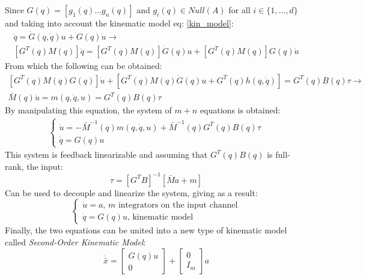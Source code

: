 \begin{itemize}
    Since $G(q)=[g_1(q)\dots g_n(q)]$ and $g_i(q)\in Null(A)$ for all $i \in \{1,\dots,d\}$ and taking into account the kinematic model eq: \ref{kin_model}:     
    \begin{gather*}
        \ddot{q}=\dot{G}(q,\dot{q})u+G(q)\dot{u}\rightarrow\\
        [G^{T}(q)M(q)]\ddot{q}=[G^{T}(q)M(q)]\dot{G}(q)u+[G^{T}(q)M(q)]G(q)\dot{u}
    \end{gather*}
    From which the following can be obtained:
    \begin{gather*}
        \left[G^{T}(q)M(q)G(q)\right]\dot{u}+\left[G^{T}(q)M(q)\dot{G}(q)u+G^{T}(q)h(q,\dot{q})\right]=G^{T}(q)B(q)\tau \rightarrow \\
        \bar{M}(q)\dot{u}=m(q,\dot{q},u)=G^{T}(q)B(q)\tau
    \end{gather*}
    By manipulating this equation, the system of $m+n$ equations is obtained:
    \begin{gather*}
        \begin{cases}
            \dot{u}=-\bar{M}^{-1}(q)m(q,\dot{q},u)+\bar{M}^{-1}(q)G^{T}(q)B(q)\tau \\
            \dot{q}=G(q)u
        \end{cases}
    \end{gather*}
    This system is feedback linearizable and assuming that $G^{T}(q)B(q)$ is full-rank, the input:
    \begin{equation*}
        \tau=\left[G^{T}B\right]^{-1}\left[\bar{M}a+m\right]
    \end{equation*}
    Can be used to decouple and linearize the system, giving as a result:
    \begin{equation*}
        \begin{cases}
            \dot{u}=a \text{, $m$ integrators on the input channel}\\
            \dot{q}=G(q)u \text{, kinematic model}
        \end{cases}
    \end{equation*}
    Finally, the two equations can be united into a new type of kinematic model called \textit{Second-Order Kinematic Model}:
    \begin{equation}\label{sec_ord_kin_mod}
        \dot{\bar{x}}=
        \begin{bmatrix}
            G(q)u \\
            0
        \end{bmatrix}
        +
        \begin{bmatrix}
            0 \\
            I_{m}
        \end{bmatrix}
        a
    \end{equation}
\end{itemize}
